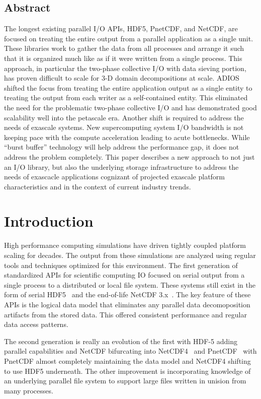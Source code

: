 \documentclass[letterpaper,twocolumn,10pt]{article}
\begin{document}
\subsection*{Abstract}
The longest existing parallel I/O APIs, HDF5, PnetCDF, and NetCDF, are focused
on treating the entire output from a parallel application as a single unit.
These libraries work to gather the data from all processes and arrange it such
that it is organized much like as if it were written from a single process.
This approach, in particular the two-phase collective I/O with data sieving
portion, has proven difficult to scale for 3-D domain decompositions at scale.
ADIOS shifted the focus from treating the entire application output as a single
entity to treating the output from each writer as a self-contained entity. This
eliminated the need for the problematic two-phase collective I/O and has
demonstrated good scalability well into the petascale era. Another shift is
required to address the needs of exascale systems. New supercomputing system
I/O bandwidth is not keeping pace with the compute acceleration leading to
acute bottlenecks.  While ``burst buffer'' technology will help address the
performance gap, it does not address the problem completely. This paper
describes a new approach to not just an I/O library, but also the underlying
storage infrastructure to address the needs of exascacle applications cognizant
of projected exascale platform characteristics and in the context of current
industry trends.

\section{Introduction}

High performance computing simulations have driven tightly coupled platform
scaling for decades. The output from these simulations are analyzed using
regular tools and techniques optimized for this environment.  The first
generation of standardized APIs for scientific computing IO focused on serial
output from a single process to a distributed or local file system.  These
systems still exist in the form of serial
HDF5~\cite{chilan:2006:hdf5-performance} and the end-of-life NetCDF
3.x~\cite{netcdf3}. The key feature of these APIs is the logical data model
that eliminates any parallel data decomoposition artifacts from the stored
data.  This offered consistent performance and regular data access patterns.

The second generation is really an evolution of the first with HDF-5 adding
parallel capabilities and NetCDF bifurcating into
NetCDF4~\cite{rew:2011:netcdf-guide} and PnetCDF~\cite{torrellas:2003:pnetcdf}
with PnetCDF almost completely maintaining the data model and NetCDF4 shifting
to use HDF5 underneath. The other improvement is incorporating knowledge of an
underlying parallel file system to support large files written in unision from
many processes.
\end{document}
